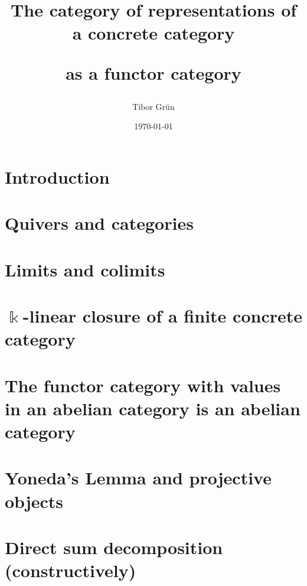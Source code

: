 \documentclass[a4paper,12pt,twoside]{article}
\title{The category of representations of a concrete category\par as a functor category}
\author{Tibor Gr{\"u}n}
\date{\today}
\begin{document}

	

	\newpage
	\phantom{}%
	\newpage

	\tableofcontents\label{toc}
	
	\newpage
	\phantom{}%
	\newpage

	
\section{Introduction}


\section{Quivers and categories}\label{sec:quivers_categories}


\section{Limits and colimits}\label{sec:limits_colimits}


\section{$\Bbbk$-linear closure of a finite concrete category}


\section{The functor category with values in an abelian category is an abelian category}


\section{Yoneda's Lemma and projective objects}


\section{Direct sum decomposition (constructively)}

\end{document}
